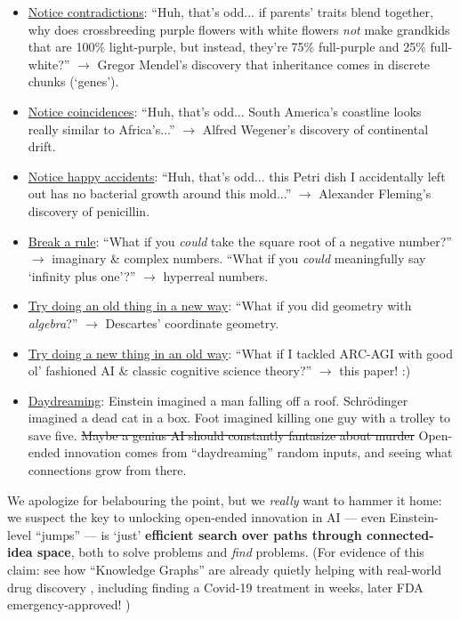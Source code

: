 \documentclass[11pt]{article}
\begin{document}
\begin{itemize}
    \item \uline{Notice contradictions}: ``Huh, that's odd... if parents' traits blend together, why does crossbreeding purple flowers with white flowers \textit{not} make grandkids that are 100\% light-purple, but instead, they're 75\% full-purple and 25\% full-white?'' $\to$ Gregor Mendel's discovery that inheritance comes in discrete chunks (`genes').
    \item \uline{Notice coincidences}: ``Huh, that's odd... South America's coastline looks really similar to Africa's...'' $\to$ Alfred Wegener's discovery of continental drift.
    \item \uline{Notice happy accidents}: ``Huh, that's odd... this Petri dish I accidentally left out has no bacterial growth around this mold...'' $\to$ Alexander Fleming's discovery of penicillin.
    \item \uline{Break a rule}: ``What if you \textit{could} take the square root of a negative number?'' $\to$ imaginary \& complex numbers. ``What if you \textit{could} meaningfully say `infinity plus one'?'' $\to$ hyperreal numbers.
    \item \uline{Try doing an old thing in a new way}: ``What if you did geometry with \textit{algebra}?'' $\to$ Descartes’ coordinate geometry.
    \item \uline{Try doing a new thing in an old way}: ``What if I tackled ARC-AGI with good ol' fashioned AI \& classic cognitive science theory?'' $\to$ this paper! :)
    \item \uline{Daydreaming}: Einstein imagined a man falling off a roof. Schrödinger imagined a dead cat in a box. Foot imagined killing one guy with a trolley to save five. \sout{Maybe a genius AI should constantly fantasize about murder} Open-ended innovation comes from ``daydreaming'' random inputs, and seeing what connections grow from there.
\end{itemize}

We apologize for belabouring the point, but we \textit{really} want to hammer it home: we suspect the key to unlocking open-ended innovation in AI — even Einstein-level ``jumps'' — is `just' \textbf{efficient search over paths through connected-idea space}, both to solve problems and \textit{find} problems. (For evidence of this claim: see how ``Knowledge Graphs'' are already quietly helping with real-world drug discovery \citep{kg_drug_discovery_review}, including finding a Covid-19 treatment in weeks, later FDA emergency-approved! \citep{baricitinib_kg,baricitinib_kg_method})
\end{document}
